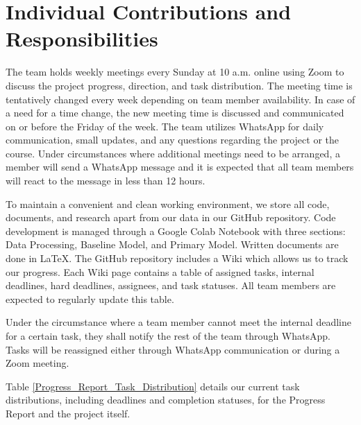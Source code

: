 \documentclass{article} %
\begin{document}
\section{Individual Contributions and Responsibilities}

The team holds weekly meetings every Sunday at 10 a.m. online using Zoom to discuss the project progress, direction, and task distribution. The meeting time is tentatively changed every week depending on team member availability. In case of a need for a time change, the new meeting time is discussed and communicated on or before the Friday of the week. The team utilizes WhatsApp for daily communication, small updates, and any questions regarding the project or the course. Under circumstances where additional meetings need to be arranged, a member will send a WhatsApp message and it is expected that all team members will react to the message in less than 12 hours.

To maintain a convenient and clean working environment, we store all code, documents, and research apart from our data in our GitHub repository. Code development is managed through a Google Colab Notebook with three sections: Data Processing, Baseline Model, and Primary Model. Written documents are done in \LaTeX{}. The GitHub repository includes a Wiki which allows us to track our progress. Each Wiki page contains a table of assigned tasks, internal deadlines, hard deadlines, assignees, and task statuses. All team members are expected to regularly update this table.

Under the circumstance where a team member cannot meet the internal deadline for a certain task, they shall notify the rest of the team through WhatsApp. Tasks will be reassigned either through WhatsApp communication or during a Zoom meeting.

Table \ref{Progress_Report_Task_Distribution} details our current task distributions, including deadlines and completion statuses, for the Progress Report and the project itself.
\end{document}
